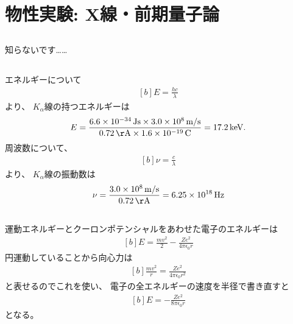 \documentclass[../../master.tex]{subfiles}
\begin{document}
\section{物性実験: X線・前期量子論}
\subsection{}
知らないです……
\subsection{}
エネルギーについて
\begin{equation}\begin{aligned}[b]
    E = \frac{hc}{\lambda}
\end{aligned}\end{equation}
より、
\(K_\alpha\)線の持つエネルギーは
\begin{equation}\begin{aligned}[b]
    E = \frac{
        6.6\times 10^{-34}\,\si{Js}\times 3.0\times 10^8 \,\si{m/s}
    }{0.72 \,\si{\AA} \times 1.6\times 10^{-19}\,\si{C}}
    = 17.2 \,\si{keV}.
\end{aligned}\end{equation}
周波数について、
\begin{equation}\begin{aligned}[b]
    \nu = \frac{c}{\lambda}
\end{aligned}\end{equation}
より、
\(K_\alpha\)線の振動数は
\begin{equation}\begin{aligned}[b]
    \nu = \frac{3.0\times 10^8 \,\si{m/s}}{0.72 \,\si{\AA}} = 6.25 \times 10^{18}\,\si{Hz}
\end{aligned}\end{equation}

\subsection{}
運動エネルギーとクーロンポテンシャルをあわせた電子のエネルギーは
\begin{equation}\begin{aligned}[b]
    E = \frac{mv^2}{2}-\frac{Ze^2}{4\pi\epsilon_0 r}
\end{aligned}\end{equation}
円運動していることから向心力は
\begin{equation}\begin{aligned}[b]
    \frac{mv^2}{r} = \frac{Ze^2}{4\pi\epsilon_0r^2}
\end{aligned}\end{equation}
と表せるのでこれを使い、
電子の全エネルギーの速度を半径で書き直すと
\begin{equation}\begin{aligned}[b]
    E = -\frac{Ze^2}{8\pi\epsilon_0 r}
\end{aligned}\end{equation}
となる。
\end{document}

